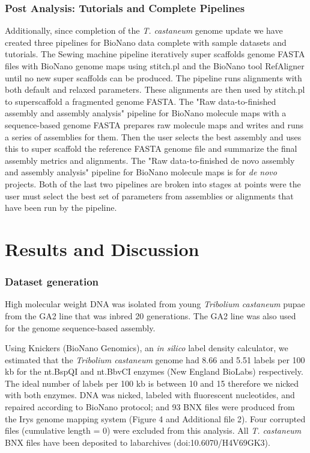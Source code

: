 \documentclass{bmcart}
\begin{document}
\subsubsection*{Post Analysis: Tutorials and Complete Pipelines}

Additionally, since completion of the \textit{T. castaneum} genome update we have created three pipelines for BioNano data complete with sample datasets and tutorials. The Sewing machine pipeline iteratively super scaffolds genome FASTA files with BioNano genome maps using stitch.pl and the BioNano tool RefAligner until no new super scaffolds can be produced. The pipeline runs alignments with both default and relaxed parameters. These alignments are then used by stitch.pl to superscaffold a fragmented genome FASTA. The "Raw data-to-finished assembly and assembly analysis" pipeline for BioNano molecule maps with a sequence-based genome FASTA prepares raw molecule maps and writes and runs a series of assemblies for them. Then the user selects the best assembly and uses this to super scaffold the reference FASTA genome file and summarize the final assembly metrics and alignments. The "Raw data-to-finished de novo assembly and assembly analysis" pipeline for BioNano molecule maps is for \textit{de novo} projects. Both of the last two pipelines are broken into stages at points were the user must select the best set of parameters from assemblies or alignments that have been run by the pipeline.
 
\section*{Results and Discussion}

\subsubsection*{Dataset generation}
High molecular weight DNA was isolated from young \textit{Tribolium castaneum} pupae from the GA2 line that was inbred 20 generations. The GA2 line was also used for the genome sequence-based assembly.


Using Knickers (BioNano Genomics), an \textit{in silico} label density calculator, we estimated that the \textit{Tribolium castaneum} genome had 8.66 and 5.51 labels per 100 kb for the nt.BspQI and nt.BbvCI enzymes (New England BioLabs) respectively. The ideal number of labels per 100 kb is between 10 and 15 therefore we nicked with both enzymes. DNA was nicked, labeled with fluorescent nucleotides, and repaired according to BioNano protocol; and 93 BNX files were produced from the Irys genome mapping system (Figure 4 and Additional file 2). Four corrupted files (cumulative length = 0) were excluded from this analysis. All \textit{T. castaneum} BNX files have been deposited to labarchives (doi:10.6070/H4V69GK3).
\end{document}
